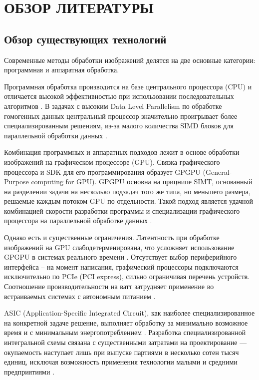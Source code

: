 \section{ОБЗОР ЛИТЕРАТУРЫ}
\label{sec:domain}

\subsection{Обзор существующих технологий}
\label{sub:domain:technologies_review}

Современные методы обработки изображений делятся на две основные категории: программная и аппаратная обработка.

Программная обработка производится на базе центрального процессора (CPU) и отличается высокой эффективностью
при использовании последовательных алгоритмов \cite{asano_dip_comp}. В задачах с высоким Data Level Parallelism по обработке гомогенных данных
центральный процессор значительно проигрывает более специализированным решениям,
из-за малого количества SIMD блоков для параллельной обработки данных \cite{axell_cpu_simd}.

Комбинация программных и аппаратных подходов лежит в основе обработки изображений на графическом процессоре (GPU).
Связка графического процессора и SDK для его программирования образует GPGPU (General-Purpose computing for GPU).
GPGPU основна на прицнипе SIMT, основанный на разделении задачи на несколько подзадач того же типа, но меньшего размера,
решаемые каждым потоком GPU по отдельности.
Такой подход является удачной комбинацией скорости разработки программы и специализации графического процессора
на параллельной обработке данных \cite{patterson_hennessy}.

Однако есть и существенные ограничения.
Латентность при обработке изображений на GPU слабодетерменирована, что усложняет использование GPGPU
в системах реального времени \cite{maceina_gpu_real_time}.
Отсутствует выбор периферийного интерфейса -- на момент написания,
графический процессоры подключаются исключительно по PCIe (PCI express), сильно ограничивая перечень устройств.
Соотношение производительности на ватт затрудняет применение во встраиваемых системах с автономным питанием \cite{fowers_gpu_power_consumption}.

ASIC (Application-Specific Integrated Circuit), как наиболее специализированное на конкретной задаче решение, выполняет обработку за минимально возможное время
и с минимальным энергопотреблением \cite{amara_asic_low_power}. Разработка специализированной интегральной схемы связана
с существенными затратами на проектирование --- окупаемость наступает лишь при выпуске партиями в несколько сотен тысяч единиц,
исключая возможность применения технологии малыми и средними предприятиями \cite{smith_asic_economy}.

